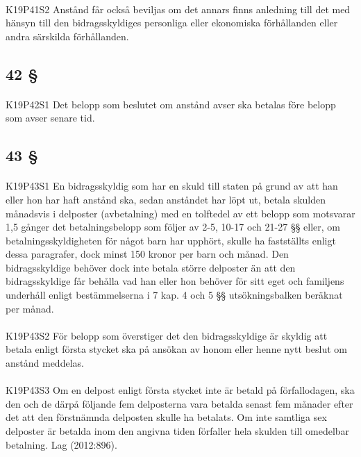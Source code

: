 \documentclass[a4paper,notitlepage,openany,10pt]{book}
\begin{document}
\paragraph*{}
{\tiny K19P41S2}
Anstånd får också beviljas om det annars finns anledning till det med hänsyn till den bidragsskyldiges personliga eller ekonomiska förhållanden eller andra särskilda förhållanden.
\subsection*{42 §}
\paragraph*{}
{\tiny K19P42S1}
Det belopp som beslutet om anstånd avser ska betalas före belopp som avser senare tid.
\subsection*{43 §}
\paragraph*{}
{\tiny K19P43S1}
En bidragsskyldig som har en skuld till staten på grund av att han eller hon har haft anstånd ska, sedan anståndet har löpt ut, betala skulden månadsvis i delposter (avbetalning) med en tolftedel av ett belopp som motsvarar 1,5 gånger det betalningsbelopp som följer av 2-5, 10-17 och 21-27 §§ eller, om betalningsskyldigheten för något barn har upphört, skulle ha fastställts enligt dessa paragrafer, dock minst 150 kronor per barn och månad. Den bidragsskyldige behöver dock inte betala större delposter än att den bidragsskyldige får behålla vad han eller hon behöver för sitt eget och familjens underhåll enligt bestämmelserna i 7 kap. 4 och 5 §§ utsökningsbalken beräknat per månad.
\paragraph*{}
{\tiny K19P43S2}
För belopp som överstiger det den bidragsskyldige är skyldig att betala enligt första stycket ska på ansökan av honom eller henne nytt beslut om anstånd meddelas.
\paragraph*{}
{\tiny K19P43S3}
Om en delpost enligt första stycket inte är betald på förfallodagen, ska den och de därpå följande fem delposterna vara betalda senast fem månader efter det att den förstnämnda delposten skulle ha betalats. Om inte samtliga sex delposter är betalda inom den angivna tiden förfaller hela skulden till omedelbar betalning.
Lag (2012:896).
\end{document}
